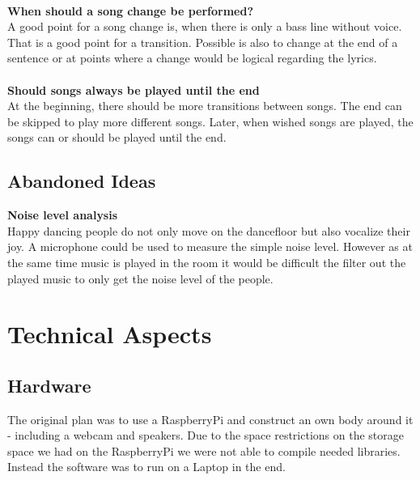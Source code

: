 \documentclass{article}
\begin{document}
\\
\textbf{When should a song change be performed?} \\
A good point for a song change is, when there is only a bass line without voice. That is a good point for a transition. Possible is also to change at the end of a sentence or at points where a change would be logical regarding the lyrics. \\
\\
\textbf{Should songs always be played until the end} \\
At the beginning, there should be more transitions between songs. The end can be skipped to play more different songs. Later, when wished songs are played, the songs can or should be played until the end.

\subsection{Abandoned Ideas}

\textbf{Noise level analysis}\\
Happy dancing people do not only move on the dancefloor but also vocalize their joy. A microphone could be used to measure the simple noise level. However as at the same time music is played in the room it would be difficult the filter out the played music to only get the noise level of the people.


\section{Technical Aspects}


\subsection{Hardware}

The original plan was to use a RaspberryPi and construct an own body around it - including a webcam and speakers. Due to the space restrictions on the storage space we had on the RaspberryPi we were not able to compile needed libraries. Instead the software was to run on a Laptop in the end.

\end{document}
